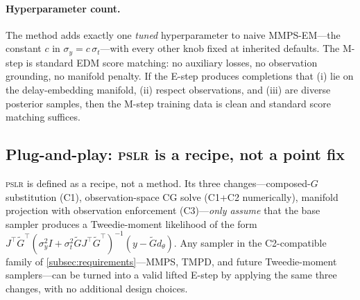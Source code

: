 \documentclass{article}
\theoremstyle{plain}
\theoremstyle{definition}
\theoremstyle{remark}
\newcommand{\pslr}{\textsc{pslr}}
\begin{document}
\paragraph{Hyperparameter count.}
The method adds exactly one \emph{tuned} hyperparameter to naive MMPS-EM---the constant $c$ in $\sigma_y = c\,\sigma_t$---with every other knob fixed at inherited defaults. The M-step is standard EDM score matching: no auxiliary losses, no observation grounding, no manifold penalty. If the E-step produces completions that (i) lie on the delay-embedding manifold, (ii) respect observations, and (iii) are diverse posterior samples, then the M-step training data is clean and standard score matching suffices.

\vspace{-1mm}
\subsection{Plug-and-play: \pslr{} is a recipe, not a point fix}
\label{subsec:plug-and-play}
\vspace{-1mm}

\pslr{} is defined as a recipe, not a method. Its three changes---composed-$G$ substitution (C1), observation-space CG solve (C1+C2 numerically), manifold projection with observation enforcement (C3)---\emph{only assume} that the base sampler produces a Tweedie-moment likelihood of the form $J^\top \tilde{G}^\top (\sigma_y^2 I + \sigma_t^2 \tilde{G} J^\top \tilde{G}^\top)^{-1}(y - \tilde{G} d_\theta)$. Any sampler in the C2-compatible family of \cref{subsec:requirements}---MMPS, TMPD, and future Tweedie-moment samplers---can be turned into a valid lifted E-step by applying the same three changes, with no additional design choices.
\end{document}
